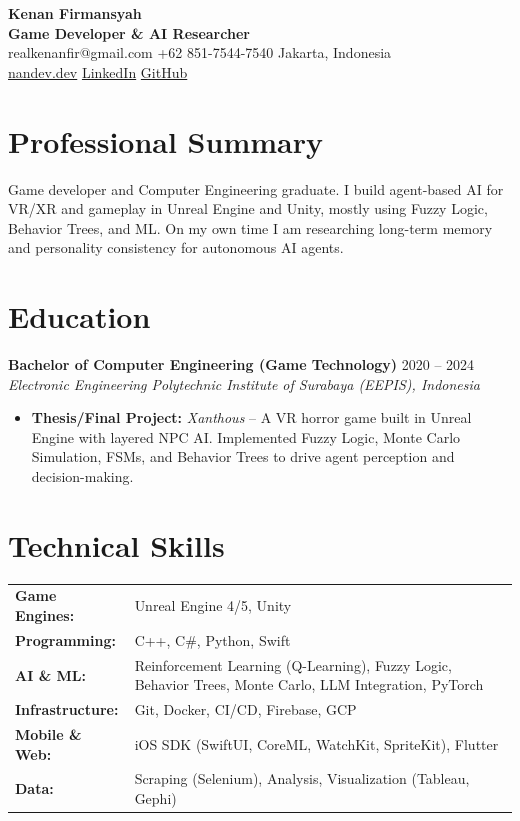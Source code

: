 \documentclass[11pt,a4paper]{article}
\begin{document}
\begin{center}
    {\huge \textbf{Kenan Firmansyah}} \\ \vspace{4pt}
    \textbf{Game Developer \& AI Researcher} \\ \vspace{4pt}
    realkenanfir@gmail.com \quad \textbar \quad +62 851-7544-7540 \quad \textbar \quad Jakarta, Indonesia \\
    \href{https://nandev.dev}{nandev.dev} \quad \textbar \quad \href{https://www.linkedin.com/in/kenanfir/}{LinkedIn} \quad \textbar \quad \href{https://github.com/Kenanfir}{GitHub}
\end{center}

\vspace{0.5em}

\section*{Professional Summary}
Game developer and Computer Engineering graduate. I build agent-based AI for VR/XR and gameplay in Unreal Engine and Unity, mostly using Fuzzy Logic, Behavior Trees, and ML. On my own time I am researching long-term memory and personality consistency for autonomous AI agents.

\section*{Education}
\noindent
\textbf{Bachelor of Computer Engineering (Game Technology)} \hfill 2020 -- 2024 \\
\textit{Electronic Engineering Polytechnic Institute of Surabaya (EEPIS), Indonesia}
\begin{itemize}
    \item \textbf{Thesis/Final Project:} \textit{Xanthous} -- A VR horror game built in Unreal Engine with layered NPC AI. Implemented Fuzzy Logic, Monte Carlo Simulation, FSMs, and Behavior Trees to drive agent perception and decision-making.
\end{itemize}

\section*{Technical Skills}
\begin{tabularx}{\textwidth}{@{}l X@{}}
    \textbf{Game Engines:} & Unreal Engine 4/5, Unity\\
    \textbf{Programming:} & C++, C\#, Python, Swift \\
    \textbf{AI \& ML:} & Reinforcement Learning (Q-Learning), Fuzzy Logic, Behavior Trees, Monte Carlo, LLM Integration, PyTorch \\
    \textbf{Infrastructure:} & Git, Docker, CI/CD, Firebase, GCP \\
    \textbf{Mobile \& Web:} & iOS SDK (SwiftUI, CoreML, WatchKit, SpriteKit), Flutter \\
    \textbf{Data:} & Scraping (Selenium), Analysis, Visualization (Tableau, Gephi)
\end{tabularx}
\end{document}
